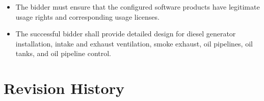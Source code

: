 \documentclass[a4paper,10pt,english,openany,oneside]{sphinxmanual}
\begin{document}
\begin{itemize}
\item {} 
\sphinxAtStartPar
The bidder must ensure that the configured software products have legitimate usage rights and corresponding usage licenses.

\item {} 
\sphinxAtStartPar
The successful bidder shall provide detailed design for diesel generator installation, intake and exhaust ventilation, smoke exhaust, oil pipelines, oil tanks, and oil pipeline control.

\end{itemize}

\appendix
{}\label{\detokenize{revision_history::doc}}

\chapter{Revision History}
\label{\detokenize{revision_history:revision-history}}
\end{document}
